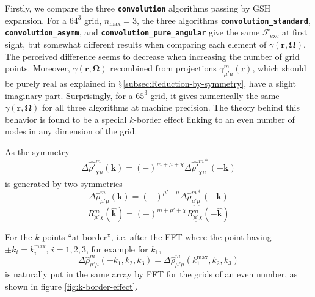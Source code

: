 Firstly, we compare the three \texttt{\textbf{convolution}} algorithms
passing by \acs{GSH} expansion. For a $64^{3}$ grid, $n_{\max}=3$,
the three algorithms \texttt{\textbf{convolution\_standard}}, \texttt{\textbf{convolution\_asymm}},
and \texttt{\textbf{convolution\_pure\_angular}} give the same $\mathcal{F}_{\mathrm{exc}}$
at first sight, but somewhat different results when comparing each
element of $\gamma(\mathbf{r},\mathbf{\Omega})$. The perceived difference
seems to decrease when increasing the number of grid points. Moreover,
$\gamma(\mathbf{r},\mathbf{\Omega})$ recombined from projections
$\gamma_{\mu'\mu}^{m}(\mathbf{r})$, which should be purely real as
explained in $\mathsection$\ref{subsec:Reduction-by-symmetry}, have
a slight imaginary part. Surprisingly, for a $65^{3}$ grid, it gives
numerically the same $\gamma(\mathbf{r},\mathbf{\Omega})$ for all
three algorithms at machine precision. The theory behind this behavior
is found to be a special $k$-border effect linking to an even number
of nodes in any dimension of the grid.

As the symmetry
\begin{equation}
\Delta\hat{\rho'}_{\chi\mu}^{m}(\mathbf{k})=(-)^{m+\mu+\chi}\Delta\hat{\rho'}_{\chi\underline{\mu}}^{m*}(-\mathbf{k})\label{eq:2-1}
\end{equation}
 is generated by two symmetries
\begin{equation}
\Delta\hat{\rho}_{\mu'\mu}^{m}(\mathbf{k})=(-)^{\mu'+\mu}\Delta\hat{\rho}_{\underline{\mu'}\underline{\mu}}^{m*}(-\mathbf{k})\label{eq:1-1}
\end{equation}
\begin{equation}
R_{\mu'\chi}^{m}(\mathbf{\hat{k}})=(-)^{m+\mu'+\chi}R_{\underline{\mu'}\chi}^{m}(-\hat{\mathbf{k}})\label{eq:3-1}
\end{equation}

For the $k$ points ``at border'', i.e. after the \acs{FFT} where
the point having $\pm k_{i}=k_{i}^{\mathrm{max}}$, $i=1,2,3$, for
example for $k_{1}$,
\begin{equation}
\Delta\hat{\rho}_{\mu'\mu}^{m}(\pm k_{1},k_{2},k_{3})=\Delta\hat{\rho}_{\mu'\mu}^{m}(k_{1}^{\mathrm{max}},k_{2},k_{3})
\end{equation}
is naturally put in the same array by FFT for the grids of an even
number, as shown in figure \ref{fig:k-border-effect}. 

